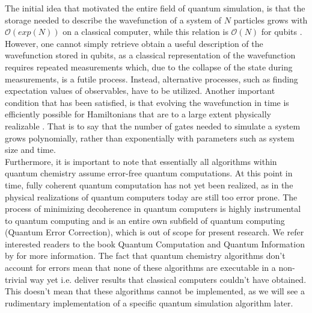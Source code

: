 The initial idea that motivated the entire field of quantum simulation, is that the storage needed to describe the wavefunction of a system of $N$ particles grows with $\mathcal{O}(exp(N))$ on a classical computer, while this relation is $\mathcal{O}(N)$ for qubits \cite{cao}. However, one cannot simply retrieve obtain a useful description of the wavefunction stored in qubits, as a classical representation of the wavefunction requires repeated measurements which, due to the collapse of the state during measurements, is a futile process. Instead, alternative processes, such as finding expectation values of observables, have to be utilized. Another important condition that has been satisfied, is that evolving the wavefunction in time is efficiently possible for Hamiltonians that are to a large extent physically realizable \cite{cao}. That is to say that the number of gates needed to simulate a system grows polynomially, rather than exponentially with parameters such as system size and time.\\

 Furthermore, it is important to note that essentially all algorithms within quantum chemistry assume error-free quantum computations. At this point in time, fully coherent quantum computation has not yet been realized, as in the physical realizations of quantum computers today are still too error prone. The process of minimizing decoherence in quantum computers is highly instrumental to quantum computing and is an entire own subfield of quantum computing (Quantum Error Correction), which is out of scope for present research. We refer interested readers to the book Quantum Computation and Quantum Information by \textcite{nielsen} for more information. The fact that quantum chemistry algorithms don't account for errors mean that none of these algorithms are executable in a non-trivial way yet i.e. deliver results that classical computers couldn't have obtained. This doesn't mean that these algorithms cannot be implemented, as we will see a rudimentary implementation of a specific quantum simulation algorithm later.\\




